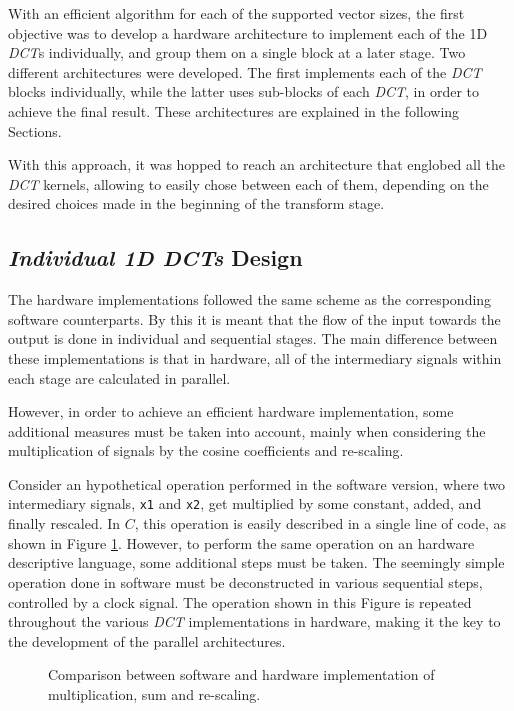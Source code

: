 With an efficient algorithm for each of the supported vector sizes, the first objective was to develop a hardware architecture to implement each of the 1D \emph{DCT}s individually, and group them on a single block at a later stage. Two different architectures were developed. The first implements each of the \emph{DCT} blocks individually, while the latter uses sub-blocks of each \emph{DCT}, in order to achieve the final result. These architectures are explained in the following Sections.

With this approach, it was hopped to reach an architecture that englobed all the \emph{DCT} kernels, allowing to easily chose between each of them, depending on the desired choices made in the beginning of the transform stage.

\subsection{\emph{Individual 1D DCTs} Design}

The hardware implementations followed the same scheme as the corresponding software counterparts. By this it is meant that the flow of the input towards the output is done in individual and sequential stages. The main difference between these implementations is that in hardware, all of the intermediary signals within each stage are calculated in parallel. 

However, in order to achieve an efficient hardware implementation, some additional measures must be taken into account, mainly when considering the multiplication of signals by the cosine coefficients and re-scaling.

Consider an hypothetical operation performed in the software version, where two intermediary signals, \texttt{x1} and \texttt{x2}, get multiplied by some constant, added, and finally rescaled. In $C$, this operation is easily described in a single line of code, as shown in Figure \ref{fig:hardsoft}. However, to perform the same operation on an hardware descriptive language, some additional steps must be taken. The seemingly simple operation done in software must be deconstructed in various sequential steps, controlled by a clock signal. The operation shown in this Figure is repeated throughout the various \emph{DCT} implementations in hardware, making it the key to the development of the parallel architectures.

\begin{figure}[htb]
    \centering
    
    \caption{Comparison between software and hardware implementation of multiplication, sum and re-scaling.}
    \label{fig:hardsoft}
\end{figure}

